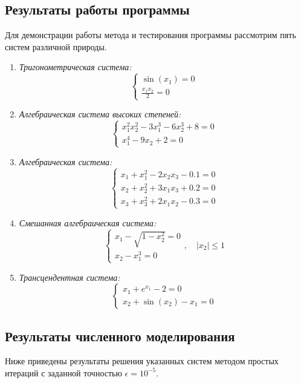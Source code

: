 \subsection{Результаты работы программы}

Для демонстрации работы метода и тестирования программы рассмотрим пять систем различной природы.

\begin{enumerate}
    \item \textit{Тригонометрическая система:}
    $$ \begin{cases} \sin(x_1) = 0 \\ \frac{x_1 x_2}{2} = 0 \end{cases} $$

    \item \textit{Алгебраическая система высоких степеней:}
    $$ \begin{cases} x_1^2 x_2^2 - 3x_1^3 - 6x_2^3 + 8 = 0 \\ x_1^4 - 9x_2 + 2 = 0 \end{cases} $$

    \item \textit{Алгебраическая система:}
    $$ \begin{cases} x_1 + x_1^2 - 2x_2x_3 - 0.1 = 0 \\ x_2 + x_2^2 + 3x_1x_3 + 0.2 = 0 \\ x_3 + x_3^2 + 2x_1x_2 - 0.3 = 0 \end{cases} $$

    \item \textit{Смешанная алгебраическая система:}
    $$ \begin{cases} x_1 - \sqrt{1 - x_2^2} = 0 \\ x_2 - x_1^3 = 0 \end{cases},\quad |x_2| \leq 1$$

    \item \textit{Трансцендентная система:}
    $$ \begin{cases} x_1 + e^{x_1} - 2 = 0 \\ x_2 + \sin(x_2) - x_1 = 0 \end{cases} $$
\end{enumerate}

\subsection{Результаты численного моделирования}

Ниже приведены результаты решения указанных систем методом простых итераций с заданной точностью $\epsilon = 10^{-5}$.

